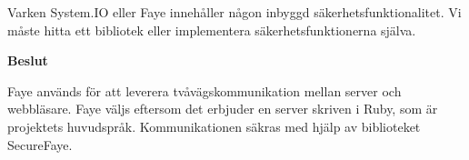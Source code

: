 Varken System.IO eller Faye innehåller någon inbyggd säkerhetsfunktionalitet. Vi måste hitta ett bibliotek eller implementera säkerhetsfunktionerna själva.

\begin{flushright}
  
  \textbf{Beslut}
  
  Faye används för att leverera tvåvägskommunikation mellan server och webbläsare. Faye väljs eftersom det erbjuder en server skriven i Ruby, som är projektets huvudspråk. Kommunikationen säkras med hjälp av biblioteket SecureFaye.
  
\end{flushright}